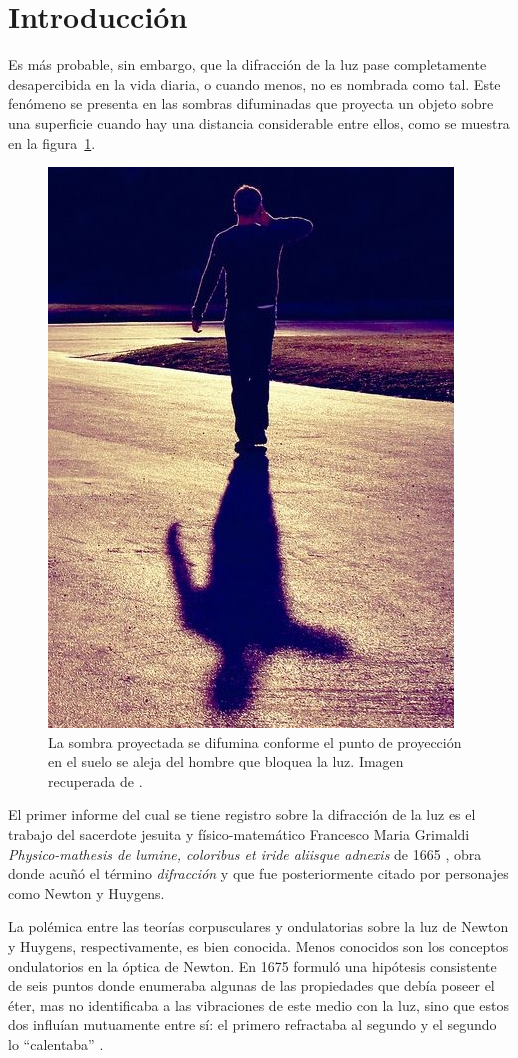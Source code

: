 \section{Introducción}

Es más probable, sin embargo, que la difracción de la luz pase completamente desapercibida en la vida diaria, o cuando menos, no es nombrada como tal.  Este fenómeno se presenta en las sombras difuminadas que proyecta un objeto sobre una superficie cuando hay una distancia considerable entre ellos, como se muestra en la figura~\ref{fig: blurry}. 

\begin{figure}[H]
	\centering
	\includegraphics[width=.4\linewidth]{Imagenes/blurry_shadow}
	\caption{La sombra proyectada se difumina conforme el punto de proyección en el suelo se aleja del hombre que bloquea la luz. Imagen recuperada de \parencite{blurry_shadow}.}
	\label{fig: blurry}
\end{figure}

El primer informe del cual se tiene registro sobre la difracción de la luz es el trabajo del sacerdote jesuita y físico-matemático Francesco Maria Grimaldi \textit{Physico-mathesis de lumine, coloribus et iride aliisque adnexis} de 1665 \parencite{Grimaldi}, obra donde acuñó el término \emph{difracción} y que fue posteriormente citado por personajes como Newton y Huygens.

La polémica entre las teorías corpusculares y ondulatorias sobre la luz de Newton y Huygens, respectivamente, es bien conocida. Menos conocidos son los conceptos ondulatorios en la óptica de Newton.  En 1675 formuló una hipótesis consistente de seis puntos donde enumeraba algunas de las propiedades que debía poseer el éter, mas no identificaba a las vibraciones de este medio con la luz, sino que estos dos influían mutuamente entre sí: el primero refractaba al segundo y el segundo lo ``calentaba'' \parencite{stuewer-1970}.

